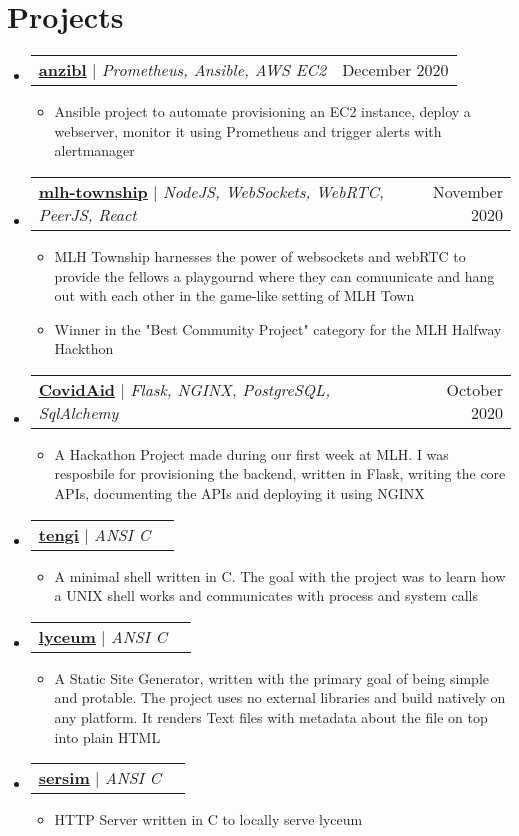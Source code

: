\documentclass[letterpaper,11pt]{article}
\makeatletter
\newcommand{\resumeItem}[1]{
  \item\small{
    {#1 \vspace{-2pt}}
  }
}
\newcommand{\resumeProjectHeading}[2]{
    \item
    \begin{tabular*}{0.97\textwidth}{l@{\extracolsep{\fill}}r}
      \small#1 & #2 \\
    \end{tabular*}\vspace{-7pt}
}
\newcommand{\resumeSubHeadingListStart}{\begin{itemize}[leftmargin=0.15in, label={}]}
\newcommand{\resumeSubHeadingListEnd}{\end{itemize}}
\newcommand{\resumeItemListStart}{\begin{itemize}}
\newcommand{\resumeItemListEnd}{\end{itemize}\vspace{-5pt}}
\makeatother
\begin{document}
\section{Projects}
    \resumeSubHeadingListStart
	  \resumeProjectHeading
		  {\href{https://github.com/awalvie/anzibl}{\underline{\textbf{anzibl}}} $|$ \emph{Prometheus, Ansible, AWS EC2}}{December 2020}
		  \resumeItemListStart
			\resumeItem{Ansible project to automate provisioning an EC2 instance, deploy a webserver, monitor it using Prometheus and trigger alerts with alertmanager}
		  \resumeItemListEnd
      \resumeProjectHeading
		  {\href{https://github.com/zerefwayne/mlh-township}{\underline{\textbf{mlh-township}}} $|$ \emph{NodeJS, WebSockets, WebRTC, PeerJS, React}}{November 2020}
          \resumeItemListStart
            \resumeItem{MLH Township harnesses the power of websockets and webRTC to provide the fellows a playgournd where they can comuunicate and hang out with each other in the game-like setting of MLH Town}
			\resumeItem{Winner in the "Best Community Project" category for the MLH Halfway Hackthon}
          \resumeItemListEnd
      \resumeProjectHeading
		  {\href{https://github.com/MLH-Fellowship/CovidAid}{\underline{\textbf{CovidAid}}} $|$ \emph{Flask, NGINX, PostgreSQL, SqlAlchemy}}{October 2020}
          \resumeItemListStart
            \resumeItem{A Hackathon Project made during our first week at MLH. I was resposbile for provisioning the backend, written in Flask, writing the core APIs, documenting the APIs and deploying it using NGINX}
          \resumeItemListEnd
	  \resumeProjectHeading
		  {\href{https://github.com/awalvie/tengi}{\underline{\textbf{tengi}}} $|$ \emph{ANSI C}}{}
		  \resumeItemListStart
			\resumeItem{A minimal shell written in C. The goal with the project was to learn how a UNIX shell works and communicates with process and system calls}
		  \resumeItemListEnd
	  \resumeProjectHeading
		  {\href{https://github.com/awalvie/lyceum}{\underline{\textbf{lyceum}}} $|$ \emph{ANSI C}}{}
		  \resumeItemListStart
			\resumeItem{A Static Site Generator, written with the primary goal of being simple and protable. The project uses no external libraries and build natively on any platform. It renders Text files with metadata about the file on top into plain HTML}
		  \resumeItemListEnd
	  \resumeProjectHeading
		  {\href{https://github.com/awalvie/sersim}{\underline{\textbf{sersim}}} $|$ \emph{ANSI C}}{}
		  \resumeItemListStart
			\resumeItem{HTTP Server written in C to locally serve lyceum}
		  \resumeItemListEnd
    \resumeSubHeadingListEnd
\end{document}

